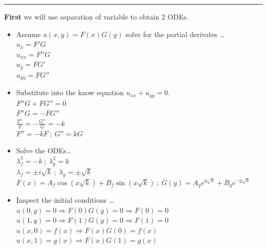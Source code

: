 \documentclass[10pt]{article}
\begin{document}
\hrule 

\vspace{7.5mm}

\noindent
\textbf{First} we will use separation of variable to obtain 2 ODEs. \\

\begin{itemize}
    \item Assume $ \displaystyle u(x,y) = F(x)G(y) $ solve for the partial derivates \dots \\
    \subitem $ \displaystyle u_{x} = F'G $ \\
    \subitem $ \displaystyle u_{xx} = F''G $ \\   
    \subitem $ \displaystyle u_{y} = FG' $ \\
    \subitem $ \displaystyle u_{yy} = FG'' $ \\
    \item Substitute into the know equation $ \displaystyle u_{xx} + u_{yy} = 0 $. \\
    \subitem $ \displaystyle F''G + FG'' = 0 $ \\
    \subitem $ \displaystyle F''G = - FG''$ \\ 
    \subitem $ \displaystyle \frac{F''}{F} =  - \frac{G''}{G} = -k $ \\
    \subitem $ \displaystyle F'' = -kF \ ; \ G'' = kG $ \\
    \item Solve the ODEs\dots \\
    \subitem $ \displaystyle \lambda_{f}^2 = -k \ ; \ \lambda_{g}^2 = k $ \\
    \subitem $ \displaystyle \lambda_{f} = \pm i \sqrt{k} \ ; \ \lambda_{g} = \pm \sqrt{k} $ \\
    \subitem $ \displaystyle F(x) = A_{f}\cos{(x\sqrt{k})} + B_{f}\sin{(x\sqrt{k})} \ ; \ G(y) = A_{g}e^{y\sqrt{k}} + B_{g}e^{-y\sqrt{k}} $ \\
    \item Inspect the initial conditions \dots \\
    \subitem $ \displaystyle u(0,y) = 0 \Rightarrow F(0)G(y) = 0 \Rightarrow F(0) = 0 $ \\
    \subitem $ \displaystyle u(1,y) = 0 \Rightarrow F(1)G(y) = 0 \Rightarrow F(1) = 0 $ \\
    \subitem $ \displaystyle u(x,0) = f(x) \Rightarrow F(x)G(0) = f(x) $ \\
    \subitem $ \displaystyle u(x,1) = g(x) \Rightarrow F(x)G(1) = g(x) $ \\

\end{itemize}
\end{document}
